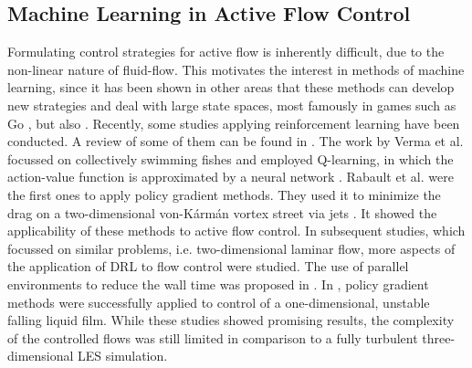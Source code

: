 \subsection{Machine Learning in Active Flow Control}
Formulating control strategies for active flow is inherently difficult, due to the non-linear nature of fluid-flow. This motivates the interest in methods of machine learning, since it has been shown in other areas that these methods can develop new strategies and deal with large state spaces, most famously in games such as Go \cite{silver_mastering_2017}, but also . Recently, some studies applying reinforcement learning have been conducted. A review of some of them can be found in \cite{garnier_review_2019}. The work by Verma et al. focussed on collectively swimming fishes and employed Q-learning, in which the action-value function is approximated by a neural network \cite{verma_efficient_2018}. Rabault et al. were the first ones to apply policy gradient methods. They used it to minimize the drag on a two-dimensional von-K\'arm\'an vortex street via jets \cite{rabault_deep_2018}. It showed the applicability of these methods to active flow control. In subsequent studies, which focussed on similar problems, i.e. two-dimensional laminar flow, more aspects of the application of DRL to flow control were studied. The use of parallel environments to reduce the wall time was proposed in \cite{rabault_accelerating_2019}. In \cite{belus_exploiting_2019}, policy gradient methods were successfully applied to control of a one-dimensional, unstable falling liquid film. While these studies showed promising results, the complexity of the controlled flows was still limited in comparison to a fully turbulent three-dimensional LES simulation. 